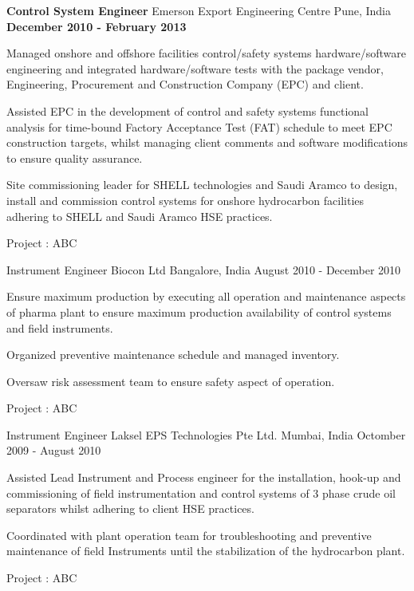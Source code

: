 \begin{cventries}
	\cventry
	{\textbf{Control System Engineer}} %
	{Emerson Export Engineering Centre} %
	{Pune, India} %
	{\textbf{December 2010 - February 2013}} %
	{ %
		\begin{cvitems}
			\item {Managed onshore and offshore facilities control/safety systems hardware/software engineering and integrated hardware/software tests with the package vendor, Engineering, Procurement and Construction Company (EPC) and client.}
			\item {Assisted EPC in the development of control and safety systems functional analysis for time-bound Factory Acceptance Test (FAT) schedule to meet EPC construction targets, whilst managing client comments and software modifications to ensure quality assurance.}
			\item {Site commissioning leader for SHELL technologies and Saudi Aramco to design, install and commission control systems for onshore hydrocarbon facilities adhering to SHELL and Saudi Aramco HSE practices.}
		\end{cvitems}
	}
	\cvprojentry
	{Project : }
	{ABC}
\end{cventries}

\begin{cventries}
	\cventry
	{Instrument Engineer} %
	{Biocon Ltd} %
	{Bangalore, India} %
	{August 2010 - December 2010} %
	{ %
		\begin{cvitems}
			\item {Ensure maximum production by executing all operation and maintenance aspects of pharma plant to ensure maximum production availability of control systems and field instruments. }
			\item {Organized preventive maintenance schedule and managed inventory. }
			\item {Oversaw risk assessment team to ensure safety aspect of operation.}	
		\end{cvitems}
	}
	\cvprojentry
	{Project : }
	{ABC}
\end{cventries}

\begin{cventries}
	\cventry
	{Instrument Engineer} %
	{Laksel EPS Technologies Pte Ltd.} %
	{Mumbai, India} %
	{Octomber 2009 - August 2010} %
	{ %
		\begin{cvitems}
			\item { Assisted Lead Instrument and Process engineer for the installation, hook-up and commissioning of field instrumentation and control systems of 3 phase crude oil separators whilst adhering to client HSE practices.} 
			\item { Coordinated with plant operation team for troubleshooting and preventive maintenance of field Instruments until the stabilization of the hydrocarbon plant.}
		\end{cvitems}
	}
	\cvprojentry
	{Project : }
	{ABC}
\end{cventries}


